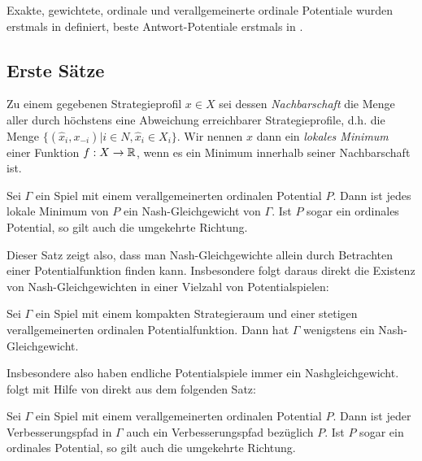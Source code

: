 Exakte, gewichtete, ordinale und verallgemeinerte ordinale Potentiale wurden erstmals in \cite{MonShap} definiert, beste Antwort-Potentiale erstmals in \cite{BestRespPot}.



\subsection{Erste Sätze}

Zu einem gegebenen Strategieprofil $x \in X$ sei dessen \emph{Nachbarschaft} die Menge aller durch höchstens eine Abweichung erreichbarer Strategieprofile, d.h. die Menge $\{(\hat{x}_i, x_{-i}) | i \in N, \hat{x}_i \in X_i\}$. Wir nennen $x$ dann ein \emph{lokales Minimum} einer Funktion $f: X \to \mathbb{R}$, wenn es ein Minimum innerhalb seiner Nachbarschaft ist.

\begin{satz}\label{satz:lokMinNG}
	Sei $\Gamma$ ein Spiel mit einem verallgemeinerten ordinalen Potential $P$. Dann ist jedes lokale Minimum von $P$ ein Nash-Gleichgewicht von $\Gamma$. Ist $P$ sogar ein ordinales Potential, so gilt auch die umgekehrte Richtung.
\end{satz}


Dieser Satz zeigt also, dass man Nash-Gleichgewichte allein durch Betrachten einer Potentialfunktion finden kann. Insbesondere folgt daraus direkt die Existenz von Nash-Gleichgewichten in einer Vielzahl von Potentialspielen:

\begin{kor}
	Sei $\Gamma$ ein Spiel mit einem kompakten Strategieraum und einer stetigen verallgemeinerten ordinalen Potentialfunktion. Dann hat $\Gamma$ wenigstens ein Nash-Gleichgewicht.
\end{kor}

Insbesondere also haben endliche Potentialspiele immer ein Nashgleichgewicht.  folgt mit Hilfe von  direkt aus dem folgenden Satz:

\begin{satz}
	Sei $\Gamma$ ein Spiel mit einem verallgemeinerten ordinalen Potential $P$. Dann ist jeder Verbesserungspfad in $\Gamma$ auch ein Verbesserungspfad bezüglich $P$. Ist $P$ sogar ein ordinales Potential, so gilt auch die umgekehrte Richtung.
\end{satz}

